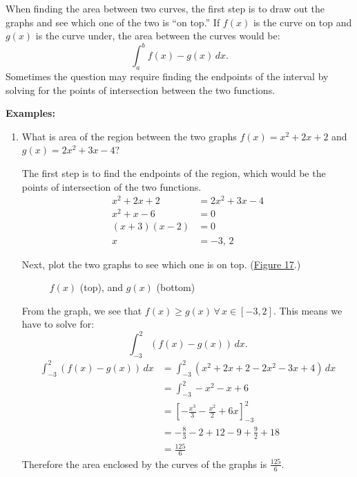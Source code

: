 \documentclass[12pt]{article}
\begin{document}
When finding the area between two curves, the first step is to draw out the graphs and see which one of the two is ``on top.'' If $f(x)$ is the curve on top and $g(x)$ is the curve under, the area between the curves would be:
\[ \int_a^b f(x) - g(x) \, dx. \]
Sometimes the question may require finding the endpoints of the interval by solving for the points of intersection between the two functions.

\noindent \textbf{Examples:}
\begin{enumerate}
    \item What is area of the region between the two graphs $f(x) = x^2 + 2x + 2$ and $g(x) = 2x^2 + 3x - 4$?

          The first step is to find the endpoints of the region, which would be the points of intersection of the two functions.
          \begin{align*}
              x^2 + 2x + 2 & = 2x^2 + 3x - 4 \\
              x^2 + x - 6  & = 0             \\
              (x+3)(x-2)   & = 0             \\
              x            & = -3, \, 2
          \end{align*}

          Next, plot the two graphs to see which one is on top. (\hyperref[fig:abcx1]{Figure 17}.)

          \begin{figure}[H]
              \begin{center}
                  \caption{$f(x)$ (top), and $g(x)$ (bottom)}
                  \label{fig:abcx1}
              \end{center}
          \end{figure}

          From the graph, we see that $f(x) \ge g(x) \, \forall \, x \in [-3, 2]$. This means we have to solve for:
          \[ \int_{-3}^2 \left( f(x) - g(x) \right) \, dx. \]
          \begin{align*}
              \int_{-3}^2 \left( f(x) - g(x) \right) \, dx & = \int_{-3}^2 \left( x^2 + 2x + 2 - 2x^2 - 3x + 4 \right) \, dx \\[6pt]
                                                           & = \int_{-3}^2 -x^2 - x + 6                                      \\[6pt]
                                                           & = \left[ -\frac{x^3}{3} -\frac{x^2}{2} + 6x \right]_{-3}^2      \\[6pt]
                                                           & = -\frac{8}{3} - 2 + 12 - 9 +\frac{9}{2} + 18                   \\[6pt]
                                                           & = \frac{125}{6}
          \end{align*}
          Therefore the area enclosed by the curves of the graphs is $\frac{125}{6}$.
          \smallskip


\end{enumerate}
\end{document}
